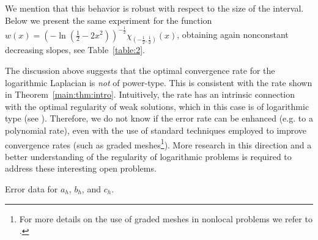 \documentclass[10 pt]{article}
\numberwithin{equation}{section}
\begin{document}
We mention that this behavior is robust with respect to the size of the interval.  Below we present the same experiment for the function 
$w(x)=\left(
-\ln\left(\frac{1}{2}-2x^2\right)\right)^{-\frac{1}{2}} \chi_{(-\frac{1}{2},\frac{1}{2})}(x)$, obtaining again nonconstant decreasing slopes, see Table~\ref{table:2}.

The discussion above suggests that the optimal convergence rate for the logarithmic Laplacian is \emph{not} of power-type. This is consistent with the rate shown in Theorem~\ref{main:thm:intro}. Intuitively, the rate has an intrinsic connection with the optimal regularity of weak solutions, which in this case is of logarithmic type (see \cite[Theorem 1.2]{HSLRS23}). Therefore, we do not know if the error rate can be enhanced (e.g. to a polynomial rate), even with the use of standard techniques employed to improve convergence rates (such as graded meshes\footnote{For more details on the use of graded meshes in nonlocal problems we refer to \cite[Section 3.4]{Bor17}.}). More research in this direction and a better understanding of the regularity of logarithmic problems is required to address these interesting open problems.

\begin{table}[htb]
\centering
%
\data
%
%
\pgfplotstabletypeset[clear infinite, empty cells with={\ensuremath{-}},
every head row/.style={
before row=\toprule,after row=\midrule},
every last row/.style={
after row=\bottomrule},
]{\data}
%
\caption{Error data  for $a_h$, $b_h$, and $c_h$.}
\label{table:1}
\end{table}
\end{document}
